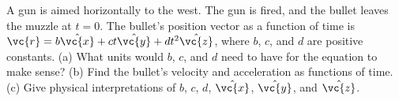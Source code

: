 A gun is aimed horizontally to the west. The gun is fired, and the bullet leaves the muzzle at
$t=0$. The bullet's position vector as a function of time is
$\vc{r}=b\hat{\vc{x}}+ct\hat{\vc{y}}+dt^2\hat{\vc{z}}$, where $b$, $c$, and $d$ are 
positive constants.\hwendpart
 (a) What units would
$b$, $c$, and $d$ need to have for the equation to make sense?\hwendpart
(b) Find the bullet's velocity and acceleration as functions
of time.\hwendpart
 (c) Give physical interpretations of $b$, $c$, $d$, $\hat{\vc{x}}$, $\hat{\vc{y}}$, and $\hat{\vc{z}}$.
